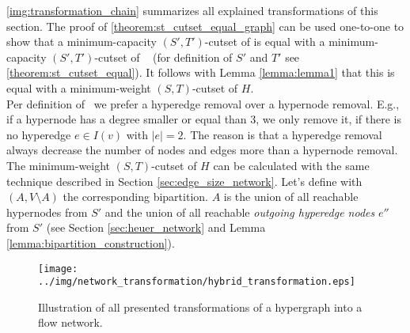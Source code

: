 \autoref{img:transformation_chain} summarizes all explained transformations of this section.
The proof of \autoref{theorem:st_cutset_equal_graph} can be used one-to-one to show that a minimum-capacity
$(S',T')$-cutset of  is equal with a minimum-capacity $(S',T')$-cutset of \ShortHybrid~
(for definition of $S'$ and $T'$ see \autoref{theorem:st_cutset_equal}). It follows with Lemma \ref{lemma:lemma1}
that this is equal with a minimum-weight $(S,T)$-cutset of $H$. \\
Per definition of \ShortHybrid~we prefer a hyperedge removal over a hypernode removal. E.g., if
a hypernode has a degree smaller or equal than $3$, we only remove it, if there is no hyperedge
$e \in I(v)$ with $|e| = 2$. The reason is that a hyperedge removal always decrease the number of nodes
and edges more than a hypernode removal. \\
The minimum-weight $(S,T)$-cutset of $H$ can be calculated with the same technique described in Section
\ref{sec:edge_size_network}. Let's define with $(A,V\setminus A)$ the corresponding bipartition.
$A$ is the union of all reachable hypernodes from $S'$ and the union of
all reachable \emph{outgoing hyperedge nodes} $e''$ from $S'$ (see Section \ref{sec:heuer_network} 
and Lemma \ref{lemma:bipartition_construction}). 

\begin{figure}
\centering
\texttt{[image: ../img/network\_transformation/hybrid\_transformation.eps]}
\caption{Illustration of all presented transformations of a hypergraph into a flow network.}
\label{img:transformation_chain}
\end{figure}
